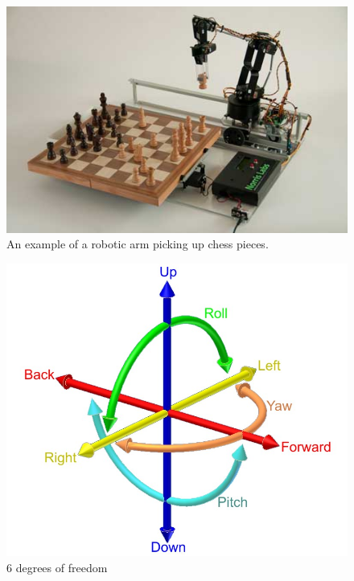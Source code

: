 \documentclass[12p,a4paper]{report}
\begin{document}
\begin{figure}[H]
\begin{center}
\includegraphics[scale=0.7]{ChessBot}
\caption{An example of a robotic arm picking up chess pieces. \cite{chessbot}}
\label{fig:ChessBot}
\end{center}
\end{figure}


\newpage

\begin{figure}
\begin{center}

\includegraphics[scale=0.40]{6DOF_en}
\caption{6 degrees of freedom \cite{6dof}}
\label{fig:6dof}
\end{center}
\end{figure}
\end{document}
